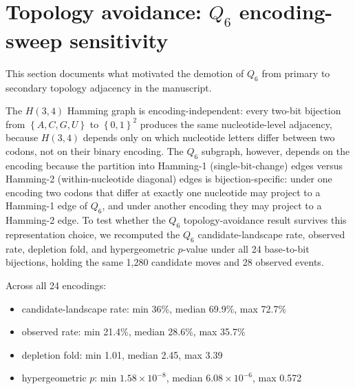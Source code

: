 \documentclass[preprint,11pt,authoryear,a4paper]{elsarticle}
\begin{document}
\protect{}\label{fig:s-topology-avoidance}{}

\section{\texorpdfstring{Topology avoidance: \(Q_{6}\) encoding-sweep
sensitivity}{Topology avoidance: Q\_\{6\} encoding-sweep sensitivity}}\label{sec:s-encoding-sweep}

This section documents what motivated the demotion of \(Q_{6}\) from
primary to secondary topology adjacency in the manuscript.

The \(H(3,4)\) Hamming graph is encoding-independent: every two-bit
bijection from \(\left\{ A,C,G,U \right\}\) to
\(\left\{ 0,1 \right\}^{2}\) produces the same nucleotide-level
adjacency, because \(H(3,4)\) depends only on which nucleotide letters
differ between two codons, not on their binary encoding. The \(Q_{6}\)
subgraph, however, depends on the encoding because the partition into
Hamming-1 (single-bit-change) edges versus Hamming-2 (within-nucleotide
diagonal) edges is bijection-specific: under one encoding two codons
that differ at exactly one nucleotide may project to a Hamming-1 edge of
\(Q_{6}\), and under another encoding they may project to a Hamming-2
edge. To test whether the \(Q_{6}\) topology-avoidance result survives
this representation choice, we recomputed the \(Q_{6}\)
candidate-landscape rate, observed rate, depletion fold, and
hypergeometric \(p\)-value under all 24 base-to-bit bijections, holding
the same 1,280 candidate moves and 28 observed events.

Across all 24 encodings:

\begin{itemize}
\item
  candidate-landscape rate: min 36\%, median 69.9\%, max 72.7\%
\item
  observed rate: min 21.4\%, median 28.6\%, max 35.7\%
\item
  depletion fold: min 1.01, median 2.45, max 3.39
\item
  hypergeometric \(p\): min \(1.58 \times 10^{- 8}\), median
  \(6.08 \times 10^{- 6}\), max 0.572
\end{itemize}
\end{document}
